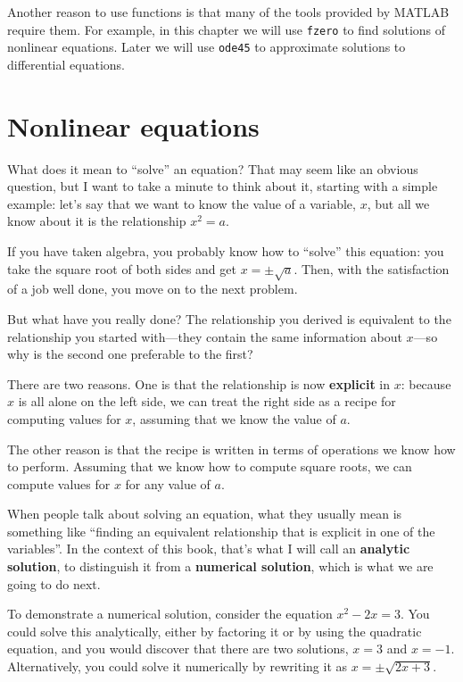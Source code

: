 \documentclass[
]{book}
\numberwithin{Answer}{chapter}
\numberwithin{Exercise}{chapter}
\begin{document}
Another reason to use functions is that many of the
tools provided by MATLAB require them.  For example,
in this chapter we will use {\tt fzero} to find solutions of nonlinear
equations.  Later we will use {\tt ode45} to approximate solutions to
differential equations.






\section{Nonlinear equations}

What does it mean to ``solve'' an equation?  That may seem like an
obvious question, but I want to take a minute to think about it,
starting with a simple example: let's say that we want to know the
value of a variable, $x$, but all we know about it is the relationship
$x^2 = a$.

If you have taken algebra, you probably know how to ``solve'' this
equation: you take the square root of both sides and get
$x = \pm \sqrt{a}$.  Then, with the satisfaction of a job well done,
you move on to the next problem.

But what have you really done?  The relationship you derived is
equivalent to the relationship you started with---they contain the
same information about $x$---so why is the second one preferable
to the first?

There are two reasons.  One is that the relationship is now {\bf explicit}
in $x$: because $x$ is all alone on the left side, we can treat
the right side as a recipe for computing values for $x$, assuming that we
know the value of $a$.

The other reason is that the recipe is written in terms of operations
we know how to perform.  Assuming that we know how to compute square
roots, we can compute values for $x$ for any value of $a$.

When people talk about solving an equation, what they usually mean
is something like ``finding an equivalent relationship that is
explicit in one of the variables''.  In the context of this book,
that's what I will call an {\bf analytic solution}, to distinguish
it from a {\bf numerical solution}, which is what we are going to
do next.


To demonstrate a numerical solution, consider the equation $x^2 - 2x =
3$.  You could solve this analytically, either by factoring it or by
using the quadratic equation, and you would discover that there are
two solutions, $x=3$ and $x=-1$.  Alternatively, you could solve it
numerically by rewriting it as $x = \pm \sqrt{2x+3}$.
\end{document}
